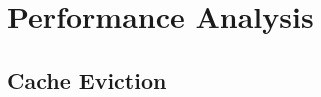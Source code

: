 \section{Performance Analysis}
\cite{10.1145/3323212}
\cite{DBLP:journals/corr/abs-1105-1633}
\cite{cassez-acsd-13}
\cite{conf/wcet/GustavssonELP10}

\subsection{Cache Eviction}
\cite{grund_et_al:OASIcs:2010:2822}
\cite{10.1145/3290367}
